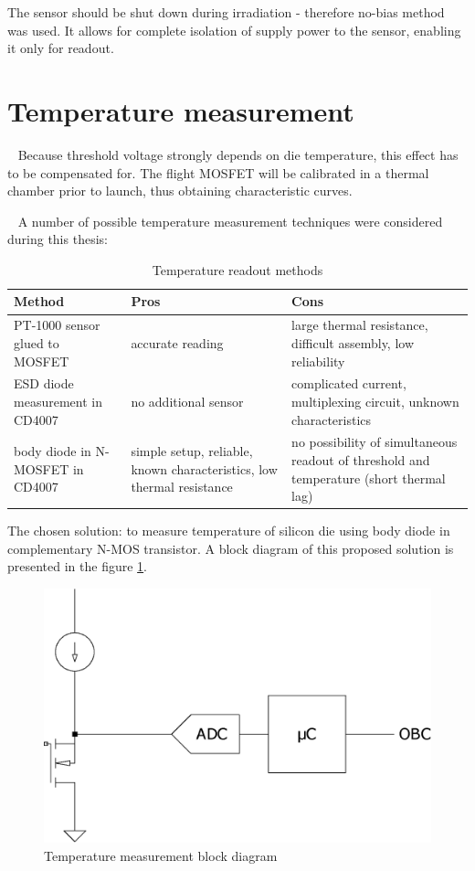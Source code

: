     The sensor should be shut down during irradiation - therefore no-bias method was used. It allows for complete isolation of supply power to the sensor, enabling it only for readout.

\section{Temperature measurement}
    Because threshold voltage strongly depends on die temperature, this effect has to be compensated for. The flight MOSFET will be calibrated in a thermal chamber prior to launch, thus obtaining characteristic curves.

    A number of possible temperature measurement techniques were considered during this thesis:
    \begin{table}[H]
    \caption{Temperature readout methods}
    \begin{tabular}{C{4.5cm} | C{5cm} | C{5cm} }
        \textbf{Method} & \textbf{Pros} & \textbf{Cons} \\ \hline

        PT-1000 sensor glued to MOSFET & accurate reading & large thermal resistance, difficult assembly, low reliability \\ \hline

        ESD diode measurement in CD4007 & no additional sensor & complicated current, multiplexing circuit, unknown characteristics \\ \hline

        body diode in N-MOSFET in CD4007  & simple setup, reliable, known characteristics, low thermal resistance & no possibility of simultaneous readout of threshold and temperature (short thermal lag)
    \end{tabular}
    \end{table}

    The chosen solution: to measure temperature of silicon die using body diode in complementary N-MOS transistor. A block diagram of this proposed solution is presented in the figure \ref{Temperature_measurement_block_diagram}.

    \begin{figure}[H]
        \centering
        \includegraphics[width=0.5\paperwidth]{img/05/n-mos-temperature.eps}
        \caption{Temperature measurement block diagram}
        \label{Temperature_measurement_block_diagram}
    \end{figure}

